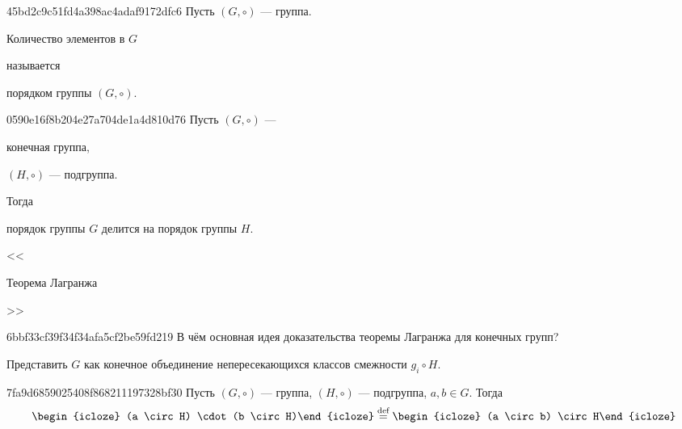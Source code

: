 \begin{note}{45bd2c9c51fd4a398ac4adaf9172dfc6}
    Пусть \({ (G, \circ) }\) --- группа.
    \begin{icloze}{1}Количество элементов в \({ G }\)\end{icloze} называется \begin{icloze}{2}порядком группы \({ (G, \circ) }\).\end{icloze}
\end{note}

\begin{note}{0590e16f8b204e27a704de1a4d810d76}
    Пусть \({ (G, \circ) }\) --- \begin{icloze}{3}конечная группа,\end{icloze} \begin{icloze}{2}\({ (H, \circ) }\) --- подгруппа.\end{icloze}
    Тогда \begin{icloze}{1}порядок группы \({ G }\) делится на порядок группы \({ H }\).\end{icloze}

    \begin{center}
        \tiny
        <<\begin{icloze}{4}Теорема Лагранжа\end{icloze}>>
    \end{center}
\end{note}

\begin{note}{6bbf33cf39f34f34afa5cf2be59fd219}
    В чём основная идея доказательства теоремы Лагранжа для конечных групп?

    \begin{cloze}{1}
        Представить \({ G }\) как конечное объединение непересекающихся классов смежности \({ g_i \circ H }\).
    \end{cloze}
\end{note}

\begin{note}{7fa9d6859025408f868211197328bf30}
    Пусть \({ (G, \circ) }\) ---  группа, \({ (H, \circ) }\) --- подгруппа,\: \({ a, b \in G }\).
    Тогда
    \[
        \begin{icloze}{2}(a \circ H) \cdot (b \circ H)\end{icloze} \overset{\text{def}}= \begin{icloze}{1}(a \circ b) \circ H\end{icloze}
    \]
\end{note}

